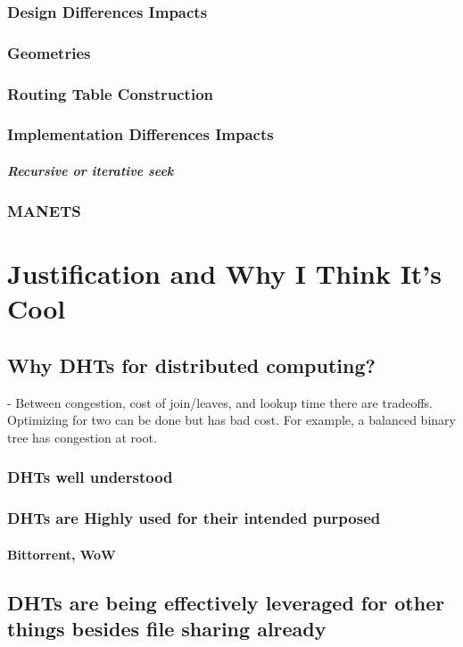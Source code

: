 \documentclass[10pt,letterpaper]{report}
\begin{document}
\subsection{Design Differences Impacts}
\subsection{Geometries}
\subsection{Routing Table Construction}
\subsection{Implementation Differences Impacts}
\paragraph{Recursive or iterative seek}


\subsection{MANETS}
\chapter{Justification and Why I Think It's Cool}

\section{Why DHTs for distributed computing?}

\cite{malkhi2001viceroy} -  Between congestion, cost of join/leaves, and lookup time there are tradeoffs.  
Optimizing for two can be done but has bad cost.
For example, a balanced binary tree has congestion at root.
\subsection{DHTs well understood}
\subsection{DHTs are Highly used for their intended purposed}
\subsubsection{Bittorrent, WoW}
\section{DHTs are being effectively leveraged for other things besides file sharing already}
\end{document}
